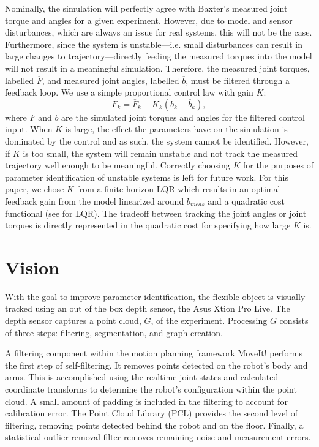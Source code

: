 \documentclass[runningheads,a4paper]{llncs}
\begin{document}
Nominally, the simulation will perfectly agree with Baxter's measured joint torque and angles for a given experiment. However, due to model and sensor disturbances, which are always an issue for real systems, this will not be the case. Furthermore, since the system is unstable---i.e. small disturbances can result in large changes to trajectory---directly feeding the measured torques into the model will not result in a meaningful simulation. Therefore, the measured joint torques, labelled $\overline{F}$, and measured joint angles, labelled $\overline{b}$, must be filtered through a feedback loop. We use a simple proportional control law with gain $K$: 
\[
F_k = \overline{F}_k - K_k (b_k - \overline{b}_k),
\]
where $F$ and $b$ are the simulated joint torques and angles for the filtered control input.  When $K$ is large, the effect the parameters have on the simulation is dominated by the control and as such, the system cannot be identified. However, if $K$ is too small, the system will remain unstable and not track the measured trajectory well enough to be meaningful.  Correctly choosing $K$ for the purposes of parameter identification of unstable systems is left for future work.  For this paper, we chose $K$ from a finite horizon LQR which results in an optimal feedback gain from the model linearized around $b_{meas}$ and a quadratic cost functional (see \cite{anderson_moore} for LQR).  The tradeoff between tracking the joint angles or joint torques is directly represented in the quadratic cost for specifying how large $K$ is.


\section{Vision}
\label{sec-vis}
With the goal to improve parameter identification, the flexible object is visually tracked using an out of the box depth sensor, the Asus Xtion Pro Live. The depth sensor captures a point cloud, $G$, of the experiment. Processing $G$ consists of three steps: filtering, segmentation, and graph creation. 

A filtering component within the motion planning framework MoveIt! \cite{coleman_etal_barrier} performs the first step of self-filtering. It removes points detected on the robot’s body and arms. This is accomplished using the realtime joint states and calculated coordinate transforms to determine the robot’s configuration within the point cloud. A small amount of padding is included in the filtering to account for calibration error. The Point Cloud Library (PCL) \cite{rusu20113d} provides the second level of filtering, removing points detected behind the robot and on the floor. Finally, a statistical outlier removal filter removes remaining noise and measurement errors.
\end{document}
